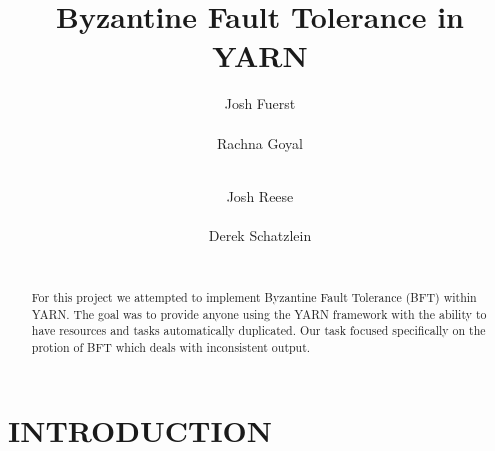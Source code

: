 \documentclass{sig-alternate}
\begin{document}
\title{Byzantine Fault Tolerance in YARN}

%
%

%
\author{
%
%
\alignauthor
Josh Fuerst\\
       \\
\alignauthor
Rachna Goyal\\
       \\
\and 
\alignauthor 
Josh Reese\\
       \\
\alignauthor 
Derek Schatzlein\\
       \\
}

\maketitle

\begin{abstract}
For this project we attempted to implement Byzantine Fault Tolerance (BFT) within YARN. The goal was to provide anyone using the 
YARN framework with the ability to have resources and tasks automatically duplicated. Our task focused specifically on the protion of 
BFT which deals with inconsistent output. 
\end{abstract}


\section{INTRODUCTION}
\end{document}
